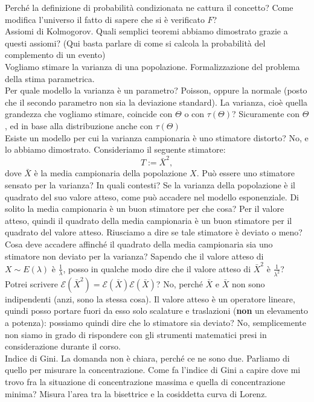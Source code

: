 \documentclass{article}
\newcommand{\bb}{\textbf}
\begin{document}
    Perché la definizione di probabilità condizionata ne cattura il concetto? Come modifica l'universo il fatto di sapere che si è verificato $ F $? \\
    Assiomi di Kolmogorov. Quali semplici teoremi abbiamo dimostrato grazie a questi assiomi? (Qui basta parlare di come si calcola la probabilità del complemento di un evento) \\
    Vogliamo stimare la varianza di una popolazione. Formalizzazione del problema della stima parametrica. \\
    Per quale modello la varianza è un parametro? Poisson, oppure la normale (posto che il secondo parametro non sia la deviazione standard). La varianza, cioè quella grandezza che
    vogliamo stimare, coincide con $ \Theta $ o con $ \tau ( \Theta ) $? Sicuramente con $ \Theta $, ed in base alla distribuzione anche con $ \tau ( \Theta ) $ \\
    Esiste un modello per cui la varianza campionaria è uno stimatore distorto? No, e lo abbiamo dimostrato. Consideriamo il seguente stimatore:
    \[
        T := \bar X^2,
    \]
    dove $ \bar X $ è la media campionaria della popolazione $ X $. Può essere uno stimatore sensato per la varianza? In quali contesti? Se la varianza della popolazione è il
    quadrato del suo valore atteso, come può accadere nel modello esponenziale. Di solito la media campionaria è un buon stimatore per che cosa? Per il valore atteso, quindi il
    quadrato della media campionaria è un buon stimatore per il quadrato del valore atteso. Riusciamo a dire se tale stimatore è deviato o meno? Cosa deve accadere affinché il
    quadrato della media campionaria sia uno stimatore non deviato per la varianza? Sapendo che il valore atteso di $ X \sim E ( \lambda ) $ è $ \frac{ 1 }{ \lambda } $, posso in
    qualche modo dire che il valore atteso di $ \bar X^2 $ è $ \frac{ 1 }{ \lambda^2 } $? Potrei scrivere $ \mathcal E ( \bar X^2 ) = \mathcal E ( \bar X ) \mathcal E ( \bar X ) $? No,
    perché $ \bar X $ e $ \bar X $ non sono indipendenti (anzi, sono la stessa cosa). Il valore atteso è un operatore lineare, quindi posso portare fuori da esso solo scalature e
    traslazioni (\bb{non} un elevamento a potenza): possiamo quindi dire che lo stimatore sia deviato? No, semplicemente non siamo in grado di rispondere con gli strumenti matematici
    presi in considerazione durante il corso. \\
    Indice di Gini. La domanda non è chiara, perché ce ne sono due. Parliamo di quello per misurare la concentrazione. Come fa l'indice di Gini a capire dove mi trovo fra la
    situazione di concentrazione massima e quella di concentrazione minima? Misura l'area tra la bisettrice e la cosiddetta curva di Lorenz. \\
    
\end{document}
